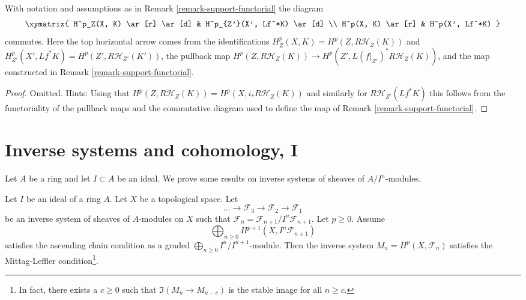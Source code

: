 \begin{lemma}
\label{lemma-support-functorial}
With notation and assumptions as in Remark \ref{remark-support-functorial}
the diagram
$$
\xymatrix{
H^p_Z(X, K) \ar[r] \ar[d] & H^p_{Z'}(X', Lf^*K) \ar[d] \\
H^p(X, K) \ar[r] & H^p(X', Lf^*K)
}
$$
commutes. Here the top horizontal arrow comes from the identifications
$H^p_Z(X, K) = H^p(Z, R\mathcal{H}_Z(K))$ and
$H^p_{Z'}(X', Lf^*K) = H^p(Z', R\mathcal{H}_{Z'}(K'))$,
the pullback map
$H^p(Z, R\mathcal{H}_Z(K)) \to H^p(Z', L(f|_{Z'})^*R\mathcal{H}_Z(K))$,
and the map constructed in Remark \ref{remark-support-functorial}.
\end{lemma}

\begin{proof}
Omitted. Hints:
Using that $H^p(Z, R\mathcal{H}_Z(K)) = H^p(X, i_*R\mathcal{H}_Z(K))$
and similarly for $R\mathcal{H}_{Z'}(Lf^*K)$ this follows from
the functoriality of the pullback maps and the commutative diagram
used to define the map of Remark \ref{remark-support-functorial}.
\end{proof}






\section{Inverse systems and cohomology, I}
\label{section-inverse-systems}

\noindent
Let $A$ be a ring and let $I \subset A$ be an ideal.
We prove some results on inverse systems of sheaves of $A/I^n$-modules.

\begin{lemma}
\label{lemma-ML-general}
Let $I$ be an ideal of a ring $A$. Let $X$ be a topological space.
Let
$$
\ldots \to \mathcal{F}_3 \to \mathcal{F}_2 \to \mathcal{F}_1
$$
be an inverse system of sheaves of $A$-modules on $X$
such that $\mathcal{F}_n = \mathcal{F}_{n + 1}/I^n\mathcal{F}_{n + 1}$.
Let $p \geq 0$. Assume
$$
\bigoplus\nolimits_{n \geq 0} H^{p + 1}(X, I^n\mathcal{F}_{n + 1})
$$
satisfies the ascending chain condition as a graded
$\bigoplus_{n \geq 0} I^n/I^{n + 1}$-module.
Then the inverse system $M_n = H^p(X, \mathcal{F}_n)$ satisfies the
Mittag-Leffler condition\footnote{In fact, there exists
a $c \geq 0$ such that $\Im(M_n \to M_{n - c})$ is the stable image
for all $n \geq c$.}.
\end{lemma}

